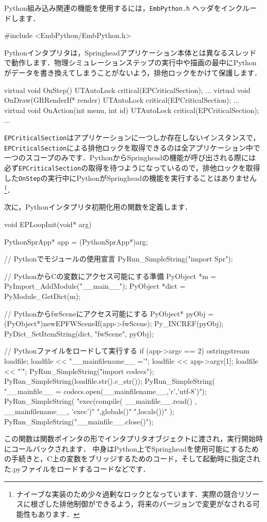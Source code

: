 Python\KLUDGE 組み込み関連の機能を使用するには，\texttt{EmbPython.h} \KLUDGE ヘッダをインクルードします．
\begin{sourcecode}
#include <EmbPython/EmbPython.h>
\end{sourcecode}

Python\KLUDGE インタプリタは，Springhead\KLUDGE アプリケーション本体とは異なるスレッドで動作します．物理シミュレーションステップの実行中や描画の最中にPython\KLUDGE がデータを書き換えてしまうことがないよう，排他ロックをかけて保護します．
\begin{sourcecode}
virtual void OnStep(){
  UTAutoLock critical(EPCriticalSection);
  ...
}
virtual void OnDraw(GRRenderIf* render) {
  UTAutoLock critical(EPCriticalSection);
  ...
}
virtual void OnAction(int menu, int id){
  UTAutoLock critical(EPCriticalSection);
  ...
}
\end{sourcecode}
\texttt{EPCriticalSection}\KLUDGE はアプリケーションに一つしか存在しないインスタンスで，\texttt{EPCriticalSection}\KLUDGE による排他ロックを取得できるのは全アプリケーション中で一つのスコープのみです．Python\KLUDGE からSpringhead\KLUDGE の機能が呼び出される際には必ず\texttt{EPCriticalSection}\KLUDGE の取得を待つようになっているので，排他ロックを取得した\texttt{OnStep}\KLUDGE の実行中にPython\KLUDGE がSpringhead\KLUDGE の機能を実行することはありません\footnote{\KLUDGE ナイーブな実装のため少々過剰なロックとなっています．実際の競合リソースに根ざした排他制御ができるよう，将来のバージョンで変更がなされる可能性もあります．}\KLUDGE ．

\KLUDGE 次に，Python\KLUDGE インタプリタ初期化用の関数を定義します．
\begin{sourcecode}
void EPLoopInit(void* arg) {
  PythonSprApp* app = (PythonSprApp*)arg;

  // Pythonでモジュールの使用宣言
  PyRun_SimpleString("import Spr");
        
  // PythonからCの変数にアクセス可能にする準備
  PyObject *m = PyImport_AddModule("__main__");
  PyObject *dict = PyModule_GetDict(m);

  // PythonからfwSceneにアクセス可能にする
  PyObject* pyObj = (PyObject*)newEPFWSceneIf(app->fwScene);
  Py_INCREF(pyObj);
  PyDict_SetItemString(dict, "fwScene", pyObj);

  // Pythonファイルをロードして実行する
  if (app->argc == 2) {
    ostringstream loadfile;
    loadfile << "__mainfilename__ ='";
    loadfile << app->argv[1];
    loadfile << "'";
    PyRun_SimpleString("import codecs");
    PyRun_SimpleString(loadfile.str().c_str());
    PyRun_SimpleString(
      "__mainfile__ = codecs.open(__mainfilename__,'r','utf-8')");
    PyRun_SimpleString(
      "exec(compile( __mainfile__.read() , __mainfilename__, 'exec')"
      ",globals()"
      ",locals())" );
    PyRun_SimpleString("__mainfile__.close()");
  }
}
\end{sourcecode}
\KLUDGE この関数は関数ポインタの形でインタプリタオブジェクトに渡され，実行開始時にコールバックされます．
\KLUDGE 中身はPython\KLUDGE 上でSpringhead\KLUDGE を使用可能にするための手続きと，C\KLUDGE 上の変数をブリッジするためのコード，そして起動時に指定された.py\KLUDGE ファイルをロードするコードなどです．

